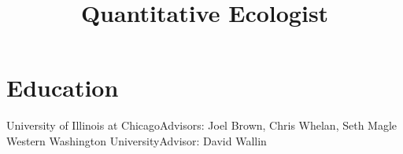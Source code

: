 \documentclass[11pt,a4paper,nolmodern]{moderncv}
\title{Quantitative Ecologist}
\begin{document}
\maketitle

\section{Education}
{University of Illinois at Chicago}{}{Advisors: Joel Brown, Chris Whelan, Seth Magle}
{Western Washington University}{}{Advisor: David Wallin}
\end{document}
